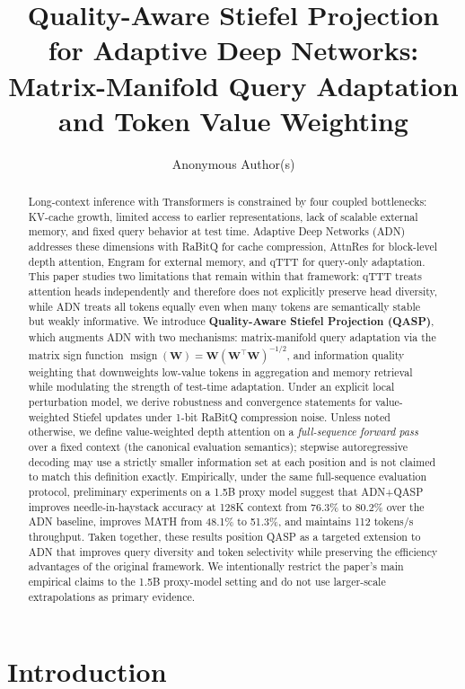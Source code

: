 \documentclass[twocolumn]{article}
\title{Quality-Aware Stiefel Projection for Adaptive Deep Networks:\\ Matrix-Manifold Query Adaptation and Token Value Weighting}
\author{Anonymous Author(s)}
\date{}
\DeclareMathOperator{\msign}{msign}
\begin{document}
\maketitle

\begin{abstract}
Long-context inference with Transformers is constrained by four coupled bottlenecks: KV-cache growth, limited access to earlier representations, lack of scalable external memory, and fixed query behavior at test time.
Adaptive Deep Networks (ADN)~\cite{adn} addresses these dimensions with RaBitQ for cache compression, AttnRes for block-level depth attention, Engram for external memory, and qTTT for query-only adaptation.
This paper studies two limitations that remain within that framework: qTTT treats attention heads independently and therefore does not explicitly preserve head diversity, while ADN treats all tokens equally even when many tokens are semantically stable but weakly informative.
We introduce \textbf{Quality-Aware Stiefel Projection (QASP)}, which augments ADN with two mechanisms: matrix-manifold query adaptation via the matrix sign function $\msign(\mathbf{W})=\mathbf{W}(\mathbf{W}^{\top}\mathbf{W})^{-1/2}$, and information quality weighting that downweights low-value tokens in aggregation and memory retrieval while modulating the strength of test-time adaptation.
Under an explicit local perturbation model, we derive robustness and convergence statements for value-weighted Stiefel updates under 1-bit RaBitQ compression noise.
Unless noted otherwise, we define value-weighted depth attention on a \emph{full-sequence forward pass} over a fixed context (the canonical evaluation semantics); stepwise autoregressive decoding may use a strictly smaller information set at each position and is not claimed to match this definition exactly.
Empirically, under the same full-sequence evaluation protocol, preliminary experiments on a 1.5B proxy model suggest that ADN+QASP improves needle-in-haystack accuracy at 128K context from 76.3\% to 80.2\% over the ADN baseline, improves MATH from 48.1\% to 51.3\%, and maintains 112 tokens/s throughput.
Taken together, these results position QASP as a targeted extension to ADN that improves query diversity and token selectivity while preserving the efficiency advantages of the original framework. We intentionally restrict the paper's main empirical claims to the 1.5B proxy-model setting and do not use larger-scale extrapolations as primary evidence.
\end{abstract}

\section{Introduction}
\end{document}
